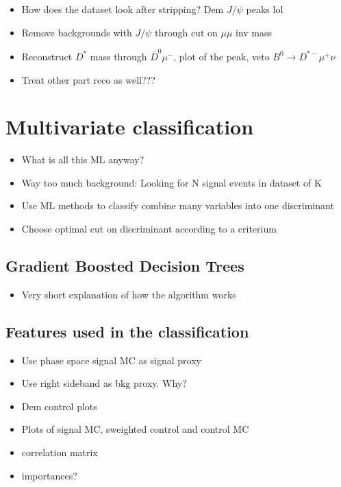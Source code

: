 \begin{itemize}
  \item How does the dataset look after stripping? Dem $J/ψ$ peaks lol
  \item Remove backgrounds with $J/ψ$ through cut on $μμ$ inv mass
  \item Reconstruct $D^*$ mass through $\overline{D}^0μ^-$, plot of the peak, veto $B^0\to D^{*-}μ^+ν$
  \item Treat other part reco as well???
\end{itemize}

\section{Multivariate classification}

\begin{itemize}
  \item What is all this ML anyway?
  \item Way too much background: Looking for N signal events in dataset of K
  \item Use ML methods to classify combine many variables into one discriminant
  \item Choose optimal cut on discriminant according to a criterium
\end{itemize}

\subsection{Gradient Boosted Decision Trees}

\begin{itemize}
  \item Very short explanation of how the algorithm works
\end{itemize}

\subsection{Features used in the classification}

\begin{itemize}
  \item Use phase space signal MC as signal proxy
  \item Use right sideband as bkg proxy. Why?
  \item Dem control plots
  \item Plots of signal MC, sweighted control and control MC
  \item correlation matrix
  \item importances?
\end{itemize}

